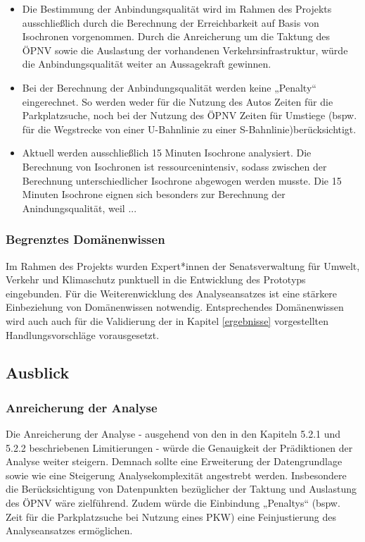 \begin{itemize}

    \item Die Bestimmung der Anbindungsqualität wird im Rahmen des Projekts ausschließlich durch die Berechnung der Erreichbarkeit auf Basis von Isochronen vorgenommen. Durch die Anreicherung um die Taktung des ÖPNV sowie die Auslastung der vorhandenen Verkehrsinfrastruktur, würde die Anbindungsqualität weiter an Aussagekraft gewinnen.

    \item Bei der Berechnung der Anbindungsqualität werden keine „Penalty“ eingerechnet. So werden weder für die Nutzung des Autos Zeiten für die Parkplatzsuche, noch bei der Nutzung des ÖPNV Zeiten für Umstiege (bspw. für die Wegstrecke von einer U-Bahnlinie zu einer S-Bahnlinie)berücksichtigt.
    \item Aktuell werden ausschließlich 15 Minuten Isochrone analysiert​. Die Berechnung von Isochronen ist ressourcenintensiv, sodass zwischen der Berechnung unterschiedlicher Isochrone abgewogen werden musste. Die 15 Minuten Isochrone eignen sich besonders zur Berechnung der Anindungsqualität, weil ...
\end{itemize}


\subsubsection{Begrenztes Domänenwissen}
Im Rahmen des Projekts wurden Expert*innen der Senatsverwaltung für Umwelt, Verkehr und Klimaschutz punktuell in die Entwicklung des Prototyps eingebunden. Für die Weiterenwicklung des Analyseansatzes ist eine stärkere Einbeziehung von Domänenwissen notwendig. Entsprechendes Domänenwissen wird auch auch für die Validierung der in Kapitel \ref{ergebnisse} vorgestellten Handlungsvorschläge vorausgesetzt.


\subsection{Ausblick}

\subsubsection{Anreicherung der Analyse}
Die Anreicherung der Analyse - ausgehend von den in den Kapiteln 5.2.1 und 5.2.2 beschriebenen Limitierungen - würde die  Genauigkeit der Prädiktionen der Analyse weiter steigern. Demnach sollte eine Erweiterung der Datengrundlage sowie wie eine Steigerung Analysekomplexität angestrebt werden. Insbesondere die Berücksichtigung von Datenpunkten bezüglicher der Taktung und Auslastung des ÖPNV wäre zielführend. Zudem würde die Einbindung „Penaltys“ (bspw. Zeit für die Parkplatzsuche bei Nutzung eines PKW) eine Feinjustierung des Analyseansatzes ermöglichen.

